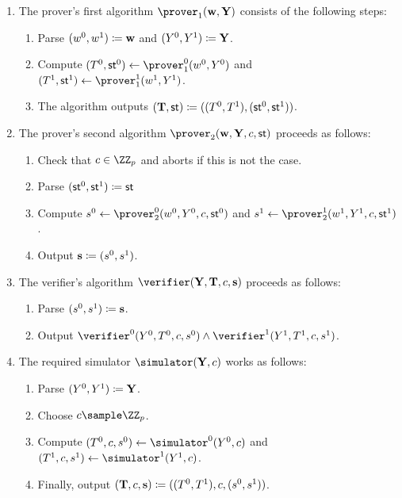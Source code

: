 \documentclass[runningheads,11pt]{article}
\begin{document}
\begin{enumerate}
  \item
    The prover's first algorithm $\prover_1(\vec \witness, \vec\statement)$ consists of the following steps:
    \begin{enumerate}
      \item
        Parse $(w^0,w^1)\coloneqq \mathbf {w}$ and $(Y^0,Y^1)\coloneqq \mathbf {Y}$.
      \item
        Compute $(\commitment^0,\st^0)\gets\prover_1^0(\witness^0, \statement^0)$ and $(\commitment^1,\st^1)\gets\prover_1^1(\witness^1, \statement^1)$.
      \item
	The algorithm outputs $(\mathbf {T},\mathsf{st}) \coloneqq ((T^0,  T^1),(\mathsf{st}^0,\mathsf{st}^1))$.
    \end{enumerate}
  \item
    The prover's second algorithm $\prover_2(\vec \witness,\vec \statement,\challenge,\st)$ proceeds as follows:
    \begin{enumerate}
      \item
        Check that $c\in\ZZ_p$ and aborts if this is not the case.
      \item
	Parse $(\mathsf{st}^0,\mathsf{st}^1)\coloneqq \mathsf{st}$
      \item
        Compute $s^0\gets\prover_2^0(\witness^0,\statement^0,\challenge,\st^0)$ and $s^1\gets\prover_2^1(\witness^1,\statement^1,\challenge,\st^1)$.
      \item
        Output $\mathbf {s}\coloneqq(s^0,s^1)$.
    \end{enumerate}
  \item
    The verifier's algorithm $\verifier(\vec \statement, \vec \commitment,\challenge,\vec \response)$ proceeds as follows:
    \begin{enumerate}
      \item
        Parse $(s^0,s^1)\coloneqq \mathbf {s}$.
      \item
	Output $\verifier^0(\statement^0, \commitment^0,\challenge, \response^0)\land\verifier^1(\statement^1, \commitment^1,\challenge, \response^1)$.
    \end{enumerate}
  \item
    The required simulator $\simulator(\vec Y,c)$ works as follows:
    \begin{enumerate}
      \item
        Parse $(Y^0,Y^1)\coloneqq \mathbf Y$.
      \item
        Choose $c\sample\ZZ_p$.
      \item
        Compute $(\commitment^0,\challenge,s^0)\gets\simulator^0(\statement^0,c)$ and $(\commitment^1,\challenge,s^1)\gets\simulator^1(\statement^1,c)$.
      \item
        Finally, output $(\mathbf {T},c, \mathbf {s})\coloneqq((T^0, T^1),c,(s^0,s^1))$.
    \end{enumerate}
\end{enumerate}
\end{document}
